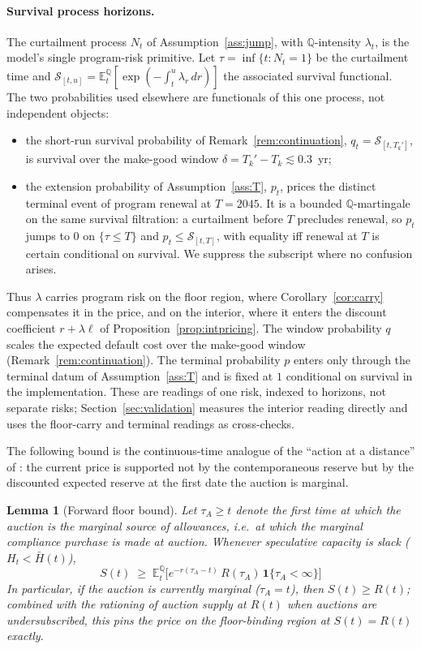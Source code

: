 \documentclass[11pt,letterpaper]{article}
\theoremstyle{plain}
\newtheorem{lemma}[theorem]{Lemma}
\theoremstyle{definition}
\newcommand{\E}{\mathbb{E}}                  %
\newcommand{\Qmeasure}{\mathbb{Q}}           %
\numberwithin{equation}{section}
\begin{document}
\paragraph{Survival process horizons.}
The curtailment process $N_t$ of Assumption~\ref{ass:jump}, with $\Qmeasure$-intensity $\lambda_t$, is the model's single program-risk primitive. Let $\tau=\inf\{t:N_t=1\}$ be the curtailment time and $\mathcal{S}_{[t,u]}=\E_t^\Qmeasure[\exp(-\!\int_t^u\lambda_r\,dr)]$ the associated survival functional. The two probabilities used elsewhere are functionals of this one process, not independent objects:
\begin{itemize}
  \item the short-run survival probability of Remark~\ref{rem:continuation}, $q_t=\mathcal{S}_{[t,T_k']}$, is survival over the make-good window $\delta=T_k'-T_k\lesssim0.3$~yr;
  \item the extension probability of Assumption~\ref{ass:T}, $p_t$, prices the distinct terminal event of program renewal at $T=2045$. It is a bounded $\Qmeasure$-martingale on the same survival filtration: a curtailment before $T$ precludes renewal, so $p_t$ jumps to $0$ on $\{\tau\le T\}$ and $p_t\le\mathcal{S}_{[t,T]}$, with equality iff renewal at $T$ is certain conditional on survival. We suppress the subscript where no confusion arises.
\end{itemize}
Thus $\lambda$ carries program risk on the floor region, where Corollary~\ref{cor:carry} compensates it in the price, and on the interior, where it enters the discount coefficient $r+\lambda\ell$ of Proposition~\ref{prop:intpricing}. The window probability $q$ scales the expected default cost over the make-good window (Remark~\ref{rem:continuation}). The terminal probability $p$ enters only through the terminal datum of Assumption~\ref{ass:T} and is fixed at $1$ conditional on survival in the implementation. These are readings of one risk, indexed to horizons, not separate risks; Section~\ref{sec:validation} measures the interior reading directly and uses the floor-carry and terminal readings as cross-checks.

The following bound is the continuous-time analogue of the ``action at a distance'' of \citet{salant2022}: the current price is supported not by the contemporaneous reserve but by the discounted expected reserve at the first date the auction is marginal.

\begin{lemma}[Forward floor bound]\label{lem:floor}
Let $\tau_A \ge t$ denote the first time at which the auction is the marginal source of allowances, i.e.\ at which the marginal compliance purchase is made at auction. Whenever speculative capacity is slack ($H_t < \bar H(t)$),
\begin{equation}\label{eq:floorbound}
S(t) \;\ge\; \E_t^{\Qmeasure}\!\bigl[e^{-r(\tau_A - t)}\,R(\tau_A)\,\mathbf{1}\{\tau_A<\infty\}\bigr]
\end{equation}
In particular, if the auction is currently marginal ($\tau_A=t$), then $S(t)\ge R(t)$; combined with the rationing of auction supply at $R(t)$ when auctions are undersubscribed, this pins the price on the floor-binding region at $S(t)=R(t)$ exactly.
\end{lemma}
\end{document}
